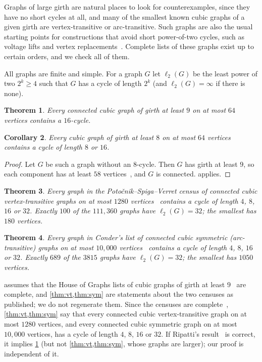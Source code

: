 \documentclass[11pt]{amsart}
\newtheorem{theorem}{Theorem}[section]
\newtheorem{corollary}[theorem]{Corollary}
\theoremstyle{remark}
\newcommand{\sv}{\ell_2}
\begin{document}
Graphs of large girth are natural places to look for counterexamples, since
they have no short cycles at all, and many of the smallest known cubic graphs
of a given girth are vertex-transitive or arc-transitive. Such graphs are also
the usual starting points for constructions that avoid short power-of-two
cycles, such as voltage lifts and vertex replacements~\cite{Exoo2014,Marszalek2026}.
Complete lists of these graphs exist up to certain orders, and we check all of
them.

All graphs are finite and simple. For a graph $G$ let $\sv(G)$ be the least power of two $2^k\ge 4$ such that $G$
has a cycle of length $2^k$ (and $\sv(G)=\infty$ if there is none).

\begin{theorem}\label{thm:girth9}
Every connected cubic graph of girth at least $9$ on at most $64$ vertices
contains a $16$-cycle.
\end{theorem}

\begin{corollary}\label{cor:girth8}
Every cubic graph of girth at least $8$ on at most $64$ vertices contains a
cycle of length $8$ or $16$.
\end{corollary}

\begin{proof}
Let $G$ be such a graph without an $8$-cycle. Then $G$ has girth at least $9$,
so each component has at least $58$ vertices~\cite{BrinkmannMcKaySaager1995},
and $G$ is connected.  applies.
\end{proof}

\begin{theorem}\label{thm:vt}
Every graph in the Potočnik--Spiga--Verret census of connected cubic
vertex-transitive graphs on at most $1280$ vertices~\cite{PSV2013} contains a
cycle of length $4$, $8$, $16$ or $32$. Exactly $100$ of the $111{,}360$ graphs
have $\sv(G)=32$; the smallest has $180$ vertices.
\end{theorem}

\begin{theorem}\label{thm:sym}
Every graph in Conder's list of connected cubic symmetric (arc-transitive)
graphs on at most $10{,}000$ vertices~\cite{ConderList} contains a cycle of
length $4$, $8$, $16$ or $32$. Exactly $689$ of the $3815$ graphs have
$\sv(G)=32$; the smallest has $1050$ vertices.
\end{theorem}

 assumes that the House of Graphs lists of cubic graphs of
girth at least $9$~\cite{HoG} are complete, and \cref{thm:vt,thm:sym} are
statements about the two censuses as published; we do not regenerate them. Since
the censuses are complete~\cite{PSV2013,ConderList}, \cref{thm:vt,thm:sym} say
that every connected cubic vertex-transitive graph on at most $1280$ vertices,
and every connected cubic symmetric graph on at most $10{,}000$ vertices, has a
cycle of length $4$, $8$, $16$ or $32$. If Ripatti's result~\cite{Ripatti2017}
is correct, it implies \cref{thm:girth9} (but not \cref{thm:vt,thm:sym}, whose
graphs are larger); our proof is independent of it.
\end{document}
